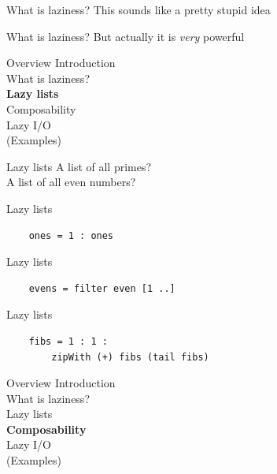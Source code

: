 \documentclass[20pt]{beamer}
\begin{document}
\begin{frame}{What is laziness?}
    This sounds like a pretty stupid idea
\end{frame}

\begin{frame}{What is laziness?}
    But actually it is \textit{very} powerful
\end{frame}


\begin{frame}{Overview}
    Introduction \\
    What is laziness? \\
    \textbf{Lazy lists} \\
    Composability \\
    Lazy I/O \\
    (Examples)
\end{frame}

\begin{frame}{Lazy lists}
    A list of all primes? \\
    A list of all even numbers?
\end{frame}

\begin{frame}[fragile]{Lazy lists}
    \begin{lstlisting}
    ones = 1 : ones
    \end{lstlisting}
\end{frame}

\begin{frame}[fragile]{Lazy lists}
    \begin{lstlisting}
    evens = filter even [1 ..]
    \end{lstlisting}
\end{frame}

\begin{frame}[fragile]{Lazy lists}
    \begin{lstlisting}
    fibs = 1 : 1 :
        zipWith (+) fibs (tail fibs)
    \end{lstlisting}
\end{frame}


\begin{frame}{Overview}
    Introduction \\
    What is laziness? \\
    Lazy lists \\
    \textbf{Composability} \\
    Lazy I/O \\
    (Examples)
\end{frame}
\end{document}
